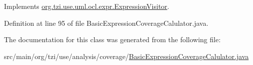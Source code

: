 Implements \hyperlink{interfaceorg_1_1tzi_1_1use_1_1uml_1_1ocl_1_1expr_1_1_expression_visitor_a269618af6ed942b79814e5e9a1119667}{org.\-tzi.\-use.\-uml.\-ocl.\-expr.\-Expression\-Visitor}.



Definition at line 95 of file Basic\-Expression\-Coverage\-Calulator.\-java.



The documentation for this class was generated from the following file\-:\begin{DoxyCompactItemize}
\item 
src/main/org/tzi/use/analysis/coverage/\hyperlink{_basic_expression_coverage_calulator_8java}{Basic\-Expression\-Coverage\-Calulator.\-java}\end{DoxyCompactItemize}
